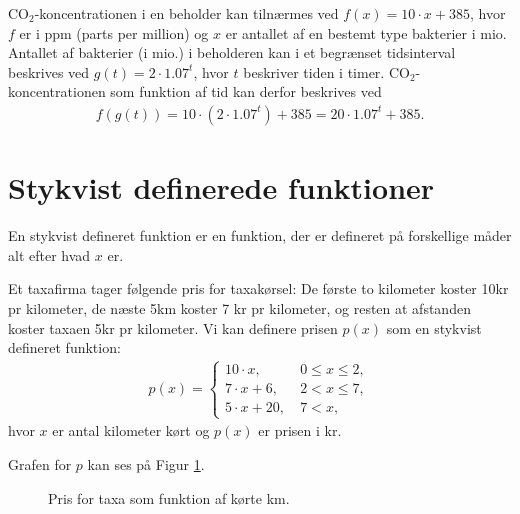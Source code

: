 \begin{exa}
CO$_2$-koncentrationen i en beholder kan tilnærmes ved $f(x) = 10\cdot x+385$, hvor $f$ er i ppm (parts per million) og $x$ er antallet af en bestemt type bakterier i mio. Antallet af bakterier (i mio.) i beholderen kan i et begrænset tidsinterval beskrives ved $g(t)= 2\cdot 1.07^t$, hvor $t$ beskriver tiden i timer. CO$_2$-koncentrationen som funktion af tid kan derfor beskrives ved
\begin{align*}
f(g(t)) = 10\cdot (2\cdot 1.07^t) + 385 = 20\cdot 1.07^t + 385.
\end{align*}
\section*{Stykvist definerede funktioner}
En stykvist defineret funktion er en funktion, der er defineret på forskellige måder alt efter hvad $x$ er.
\begin{exa}
Et taxafirma tager følgende pris for taxakørsel: De første to kilometer koster 10kr pr kilometer, de næste 5km koster 7 kr pr kilometer, og resten at afstanden koster taxaen 5kr pr kilometer. Vi kan definere prisen $p(x)$ som en stykvist defineret funktion:
\begin{align*}
p(x)=
\begin{cases}
10\cdot x, \ &0\leq x \leq 2,\\
7\cdot x + 6,\ &2 < x \leq 7,\\
5 \cdot x + 20,\ &7<x,
\end{cases}
\end{align*}
hvor $x$ er antal kilometer kørt og $p(x)$ er prisen i kr. 
\end{exa}
Grafen for $p$ kan ses på Figur \ref{fig:stykvis}.
\begin{figure}[H]
\centering
{}
\caption{Pris for taxa som funktion af kørte km.}
\label{fig:stykvis}
\end{figure}
\end{exa}
